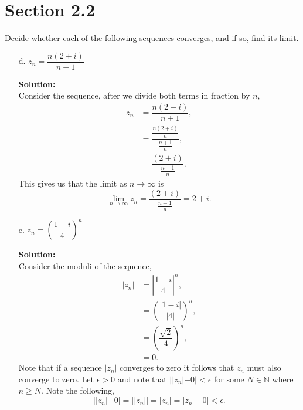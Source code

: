 \documentclass[12pt]{article}
\makeatletter
\theoremstyle{homework}
\newenvironment{exercise}[1]
{\def\@currentlabel{#1}\exercisecore}
{\endexercisecore}
\newcommand{\localhead}[1]{\par\smallskip\noindent\textbf{#1}\nobreak\\}%
\newcommand\solution{\localhead{Solution:}}
\makeatother
\begin{document}
\section*{Section 2.2}

\begin{exercise}{7} Decide whether each of the following sequences converges, and if so, find its limit.\\
    \begin{enumerate}
        \item[d.] $z_n = \dfrac{n(2+i)}{n+1}$\\
        \solution Consider the sequence, after we divide both terms in fraction by $n$, 
        \begin{align*}
            z_n &= \dfrac{n(2+i)}{n+1},\\
            &= \dfrac{\frac{n(2+i)}{n}}{\frac{n+1}{n}},\\
            &= \dfrac{(2+i)}{\frac{n+1}{n}}.
        \end{align*}
        This gives us that the limit as $n \to \infty$ is 
        \begin{equation*}
            \lim_{n \to \infty} z_n = \dfrac{(2+i)}{\frac{n+1}{n}} = 2 + i. 
        \end{equation*}
        \vspace{.15in}
        
        


        \item[e.] $z_n = \left(\dfrac{1 - i}{4}\right)^n$\\
        \solution Consider the moduli of the sequence, 
        \begin{align*}
         |z_n|&= \left|\dfrac{1 - i}{4}\right|^n,\\
         &= \left(\dfrac{|1 - i|}{|4|}\right)^n,\\
         &= \left(\dfrac{\sqrt{2}}{4}\right)^n, \\
         &= 0.
        \end{align*}
        Note that if a sequence $|z_n|$ converges to zero it follows that $z_n$ must also converge to zero. 
        Let $\epsilon >0$ and note that $||z_n| - 0| < \epsilon$ for some $N \in \mathbb{N}$ where $n \geq N$. Note the following, 
        \begin{equation*}
          ||z_n| - 0| = ||z_n|| = |z_n| = |z_n - 0| < \epsilon. 
        \end{equation*}
    \end{enumerate}
\end{exercise}
\vspace{.15in}
\end{document}
